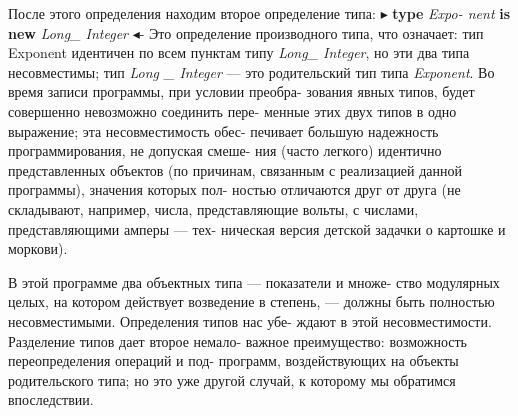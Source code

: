 \noindent После этого определения находим второе определение типа: $\blacktriangleright$ {\bf type} {\it Ex­po-\linebreak
 nent } {\bf is new} {\it Long\_ Integer} $\blacktriangleleft$- Это определение производного типа, что\linebreak
означает: тип Exponent идентичен по всем пунктам типу {\it Long\_ Integer},\linebreak
но эти два типа несовместимы; тип {\it Long \_ Integer} — это родительский\linebreak
тип типа {\it Exponent}. Во время записи программы, при условии преобра­-\linebreak
зования явных типов, будет совершенно невозможно соединить пере­-\linebreak
менные этих двух типов в одно выражение; эта несовместимость обес­-\linebreak
печивает большую надежность программирования, не допуская смеше­-\linebreak
ния (часто легкого) идентично представленных объектов (по причинам,\linebreak
связанным с реализацией данной программы), значения которых пол­-\linebreak
ностью отличаются друг от друга (не складывают, например, числа,\linebreak
представляющие вольты, с числами, представляющими амперы — тех­-\linebreak
ническая версия детской задачки о картошке и моркови).

В этой программе два объектных типа — показатели и множе­-\linebreak
ство модулярных целых, на котором действует возведение в степень, —\linebreak
должны быть полностью несовместимыми. Определения типов нас убе­-\linebreak
ждают в этой несовместимости. Разделение типов дает второе немало­-\linebreak
важное преимущество: возможность переопределения операций и под­-\linebreak
программ, воздействующих на объекты родительского типа; но это уже\linebreak
другой случай, к которому мы обратимся впоследствии.

